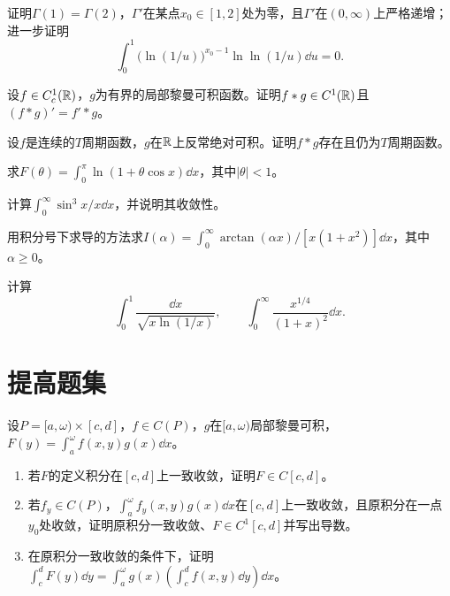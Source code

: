 证明$\Gamma(1)=\Gamma(2)$，$\Gamma'$在某点$x_0\in[1,2]$处为零，且$\Gamma'$在$(0,\infty)$上严格递增；进一步证明
\[
 \int_0^1\bigl(\ln(1/u)\bigr)^{x_0-1}\ln\ln(1/u)\dd u=0.
\]

设$f\in C_c^1(\mathbb R)$，$g$为有界的局部黎曼可积函数。证明$f*g\in C^1(\mathbb R)$且$(f*g)'=f'*g$。

设$f$是连续的$T$周期函数，$g$在$\mathbb R$上反常绝对可积。证明$f*g$存在且仍为$T$周期函数。

求$F(\theta)=\int_0^\pi\ln(1+\theta\cos x)\dd x$，其中$|\theta|<1$。

计算$\int_0^\infty\sin^3x/x\dd x$，并说明其收敛性。

用积分号下求导的方法求$I(\alpha)=\int_0^\infty\arctan(\alpha x)/[x(1+x^2)]\dd x$，其中$\alpha\ge0$。

计算
\[
 \int_0^1\frac{\dd x}{\sqrt{x\ln(1/x)}},\qquad
 \int_0^\infty\frac{x^{1/4}}{(1+x)^2}\dd x.
\]

\clearpage
\section{提高题集}
设$P=[a,\omega)\times[c,d]$，$f\in C(P)$，$g$在$[a,\omega)$局部黎曼可积，$F(y)=\int_a^\omega f(x,y)g(x)\dd x$。
\begin{enumerate}[label=(\arabic*)]
\item 若$F$的定义积分在$[c,d]$上一致收敛，证明$F\in C[c,d]$。
\item 若$f_y\in C(P)$，$\int_a^\omega f_y(x,y)g(x)\dd x$在$[c,d]$上一致收敛，且原积分在一点$y_0$处收敛，证明原积分一致收敛、$F\in C^1[c,d]$并写出导数。
\item 在原积分一致收敛的条件下，证明$\int_c^dF(y)\dd y=\int_a^\omega g(x)(\int_c^df(x,y)\dd y)\dd x$。
\end{enumerate}

